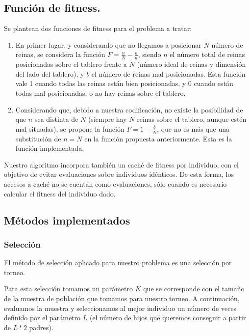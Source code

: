 \documentclass[12pt]{article}
\begin{document}

\subsection{Función de fitness.}

Se plantean dos funciones de fitness para el problema a tratar:

\begin{enumerate}
    \item En primer lugar, y considerando que no llegamos a posicionar $N$ número de reinas, se considera la función $F=\frac{n}{N} - \frac{b}{n}$, siendo $n$ el número total de reinas posicionadas sobre el tablero frente a $N$ (número ideal de reinas y dimensión del lado del tablero), y $b$ el número de reinas mal posicionadas. Esta función vale 1 cuando todas las reinas están bien posicionadas, y 0 cuando están todas mal posicionadas, o no hay reinas sobre el tablero.
    \item Considerando que, debido a nuestra codificación, no existe la posibilidad de que $n$ sea distinta de $N$ (siempre hay $N$ reinas sobre el tablero, aunque estén mal situadas), se propone la función $F=1-\frac{b}{N}$, que no es más que una substitución de $n=N$ en la función propuesta anteriormente. Esta es la función implementada.
\end{enumerate}

Nuestro algoritmo incorpora también un caché de fitness por individuo, con el objetivo de evitar evaluaciones sobre individuos idénticos. De esta forma, los accesos a caché no se cuentan como evaluaciones, sólo cuando es necesario calcular el fitness del individuo dado.

\subsection{Métodos implementados}

\subsubsection{Selección}

El método de selección aplicado para nuestro problema es una selección por torneo.

Para esta selección tomamos un parámetro $K$ que se corresponde con el tamaño de la muestra de población que tomamos para nuestro torneo. A continuación, evaluamos la muestra y seleccionamos al mejor individuo un número de veces definido por el parámetro $L$ (el número de hijos que queremos conseguir a partir de $L*2$ padres).
\end{document}
